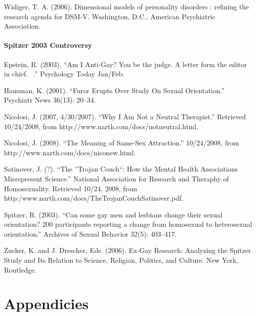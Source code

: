\begin{refsection}
Widiger, T. A. (2006). Dimensional models of personality disorders : refining the research agenda for DSM-V. Washington, D.C., American Psychiatric Association.

\subsubsection{Spitzer 2003 Controversy}
\label{spitzer2003controversy}

Epstein, R. (2003). ``Am I Anti-Gay? You be the judge. A letter form the editor in chief.  .'' Psychology Today Jan\slash Feb.

Hausman, K. (2001). ``Furor Erupts Over Study On Sexual Orientation.'' Psychiatr News 36(13): 20--34.

Nicolosi, J. (2007, 4\slash 30\slash 2007). ``Why I Am Not a Neutral Therapist.'' Retrieved 10\slash 24\slash 2008, from http:\slash \slash www.narth.com\slash docs\slash notneutral.html.

Nicolosi, J. (2008). ``The Meaning of Same-Sex Attraction.'' 10\slash 24\slash 2008, from http:\slash \slash www.narth.com\slash docs\slash niconew.html.

Satinover, J. (?). ``The ''Trojan Couch``: How the Mental Health Associations Misrepresent Science.'' National Association for Research and Theraphy of Homosexuality. Retrieved 10\slash 24, 2008, from http:\slash www.narth.com\slash docs\slash TheTrojanCouchSatinover.pdf.

Spitzer, R. (2003). ``Can some gay men and lesbians change their sexual orientation? 200 participants reporting a change from homosexual to heterosexual orientation.'' Archives of Sexual Behavior 32(5): 403--417.

Zucker, K. and J. Drescher, Eds. (2006). Ex-Gay Research: Analyzing the Spitzer Study and Its Relation to Science, Religion, Politics, and Culture. New York, Routledge.

\pagebreak 

 \renewcommand*{\thechapter}{}
\renewcommand*{\thesection}{\Alph{section}}
\setcounter{chapter}{0}
\renewcommand*{\thesubsection}{\arabic{subsection}}



\chapter{Appendicies}
\label{appendicies}

\begin{appendices}
\let\svaddcontentsline\addcontentsline
\renewcommand\addcontentsline[3]{%
  \ifthenelse{\equal{#1}{lof}}{}%
  {\ifthenelse{\equal{#1}{lot}}{}{\svaddcontentsline{#1}{#2}{#3}}}}






\end{appendices}
\end{refsection}
